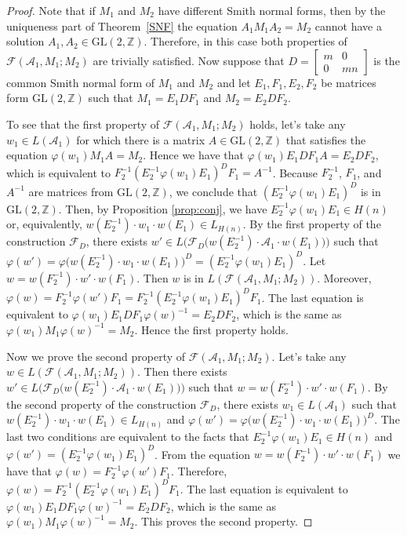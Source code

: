 \documentclass[fontsize=11pt,DIV=13,paper=letter]{scrartcl}
\theoremstyle{definition}
\newcommand{\A}{\mathcal{A}}
\newcommand{\Z}{\mathbb{Z}}
\newcommand{\F}{\mathcal{F}}
\newcommand{\GL}{\mathrm{GL}(2,\Z)}
\renewcommand{\phi}{\varphi}
\begin{document}
\begin{proof}
Note that if $M_1$ and $M_2$ have different Smith normal forms, then by the uniqueness part of Theorem~\ref{SNF} the equation $A_1M_1A_2=M_2$ cannot have a solution $A_1,A_2\in \GL$. Therefore, in this case both properties of $\F(\A_1,M_1;M_2)$ are trivially satisfied. Now suppose that $D=\begin{bmatrix} m & 0\\ 0 & mn \end{bmatrix}$ is the common Smith normal form of $M_1$ and $M_2$ and let $E_1,F_1,E_2,F_2$ be matrices form $\GL$ such that $M_1=E_1DF_1$ and $M_2=E_2DF_2$.

To see that the first property of $\F(\A_1,M_1;M_2)$ holds, let's take any $w_1\in L(\A_1)$ for which there is a matrix $A\in \GL$ that satisfies the equation $\phi(w_1)M_1A=M_2$. Hence we have that $\phi(w_1)E_1DF_1A=E_2DF_2$, which is equivalent to $F_2^{-1}(E_2^{-1}\phi(w_1)E_1)^D F_1=A^{-1}$. Because $F_2^{-1}$, $F_1$, and $A^{-1}$ are matrices from $\GL$, we conclude that $(E_2^{-1}\phi(w_1)E_1)^D$ is in $\GL$. Then, by Proposition \ref{prop:conj}, we have $E_2^{-1}\phi(w_1)E_1\in H(n)$ or, equivalently, $w(E_2^{-1})\cdot w_1 \cdot w(E_1)\in L_{H(n)}$. By the first property of the construction $\F_D$, there exists $w'\in L\big(\F_D\big(w(E_2^{-1})\cdot \A_1\cdot w(E_1)\big)\big)$ such that $\phi(w')=\phi\big(w(E_2^{-1})\cdot w_1 \cdot w(E_1)\big)^D = (E_2^{-1}\phi(w_1) E_1)^D$. Let $w=w(F_2^{-1})\cdot w'\cdot w(F_1)$. Then $w$ is in $L(\F(\A_1,M_1;M_2))$. Moreover, $\phi(w)= F_2^{-1}\phi(w') F_1 = F_2^{-1}(E_2^{-1}\phi(w_1) E_1)^D F_1$. The last equation is equivalent to $\phi(w_1)E_1DF_1 \phi(w)^{-1}= E_2DF_2$, which is the same as $\phi(w_1)M_1 \phi(w)^{-1}= M_2$. Hence the first property holds.

Now we prove the second property of $\F(\A_1,M_1;M_2)$. Let's take any $w\in L(\F(\A_1,M_1;M_2))$. Then there exists $w'\in L\big(\F_D\big(w(E_2^{-1})\cdot \A_1\cdot w(E_1)\big)\big)$ such that $w=w(F_2^{-1})\cdot w'\cdot w(F_1)$. By the second property of the construction $\F_D$, there exists $w_1\in L(\A_1)$ such that $w(E_2^{-1})\cdot w_1\cdot w(E_1)\in L_{H(n)}$ and $\phi(w') = \phi\big(w(E_2^{-1})\cdot w_1\cdot w(E_1)\big)^D$. The last two conditions are equivalent to the facts that $E_2^{-1}\phi(w_1)E_1\in H(n)$ and $\phi(w') = (E_2^{-1}\phi(w_1)E_1)^D$. From the equation $w=w(F_2^{-1})\cdot w'\cdot w(F_1)$ we have that $\phi(w)=F_2^{-1}\phi(w')F_1$. Therefore, $\phi(w)=F_2^{-1}(E_2^{-1}\phi(w_1)E_1)^DF_1$. The last equation is equivalent to $\phi(w_1)E_1DF_1 \phi(w)^{-1}= E_2DF_2$, which is the same as $\phi(w_1)M_1 \phi(w)^{-1}= M_2$. This proves the second property.

\end{proof}
\end{document}
